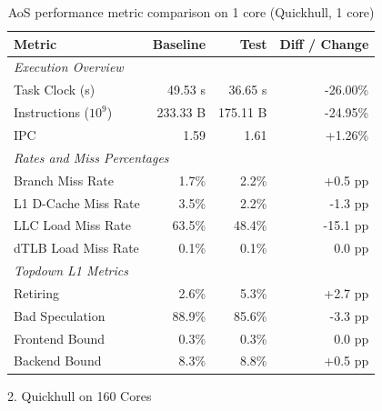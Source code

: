 \documentclass[leqno,11pt]{article}
\begin{document}
    \begin{table}[htbp]
      \centering
      \caption{AoS performance metric comparison on 1 core (Quickhull, 1 core)}
      \label{tab:perf_comparison_aos_quickhull_1core}
      \begin{tabular}{lrrr}
        \toprule
        \textbf{Metric} & \textbf{Baseline} & \textbf{Test} & \textbf{Diff / Change} \\
        \midrule
        \multicolumn{4}{l}{\textit{Execution Overview}} \\
        \quad Task Clock (s)           & 49.53 s   & 36.65 s   & -26.00\%   \\
        \quad Instructions ($10^9$)    & 233.33 B  & 175.11 B  & -24.95\%   \\
        \quad IPC                      & 1.59       & 1.61       & +1.26\%    \\
        \midrule
        \multicolumn{4}{l}{\textit{Rates and Miss Percentages}} \\
        \quad Branch Miss Rate         & 1.7\%      & 2.2\%      & +0.5 pp    \\
        \quad L1 D-Cache Miss Rate     & 3.5\%      & 2.2\%      & -1.3 pp    \\
        \quad LLC Load Miss Rate       & 63.5\%     & 48.4\%     & -15.1 pp   \\
        \quad dTLB Load Miss Rate      & 0.1\%      & 0.1\%      & 0.0 pp     \\
        \midrule
        \multicolumn{4}{l}{\textit{Topdown L1 Metrics}} \\
        \quad Retiring                 & 2.6\%      & 5.3\%      & +2.7 pp    \\
        \quad Bad Speculation          & 88.9\%     & 85.6\%     & -3.3 pp    \\
        \quad Frontend Bound           & 0.3\%      & 0.3\%      & 0.0 pp     \\
        \quad Backend Bound            & 8.3\%      & 8.8\%      & +0.5 pp    \\
        \bottomrule
      \end{tabular}
    \end{table}

  2. Quickhull on 160 Cores
\end{document}
